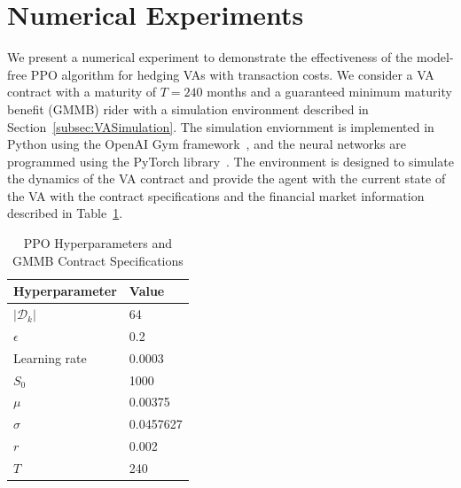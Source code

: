 \section{Numerical Experiments}

We present a numerical experiment to demonstrate the effectiveness of the model-free PPO algorithm for hedging VAs with transaction costs.
We consider a VA contract with a maturity of $T=240$ months and a guaranteed minimum maturity benefit (GMMB) rider with a simulation environment described in Section~\ref{subsec:VASimulation}.
The simulation enviornment is implemented in Python using the OpenAI Gym framework~\citep{brockman2016openai}, and the neural networks are programmed using the PyTorch library~\citep{paszke2019pytorch}.
The environment is designed to simulate the dynamics of the VA contract and provide the agent with the current state of the VA with the contract specifications and the financial market information described in Table~\ref{tab3:hyperparameters}.

\begin{table}[ht!]
    \centering
    \begin{tabular}{ll} 
        \toprule
        Hyperparameter      & Value \\
        \midrule
        $|\mathcal{D}_k|$   & 64        \\
        $\epsilon$          & 0.2       \\
        Learning rate       & 0.0003    \\
        $S_0$               & 1000      \\
        $\mu$               & 0.00375   \\
        $\sigma$            & 0.0457627 \\
        $r$                 & 0.002     \\
        $T$                 & 240       \\
        \bottomrule
    \end{tabular}
    \caption{PPO Hyperparameters and GMMB Contract Specifications} 
    \label{tab3:hyperparameters}
\end{table}

